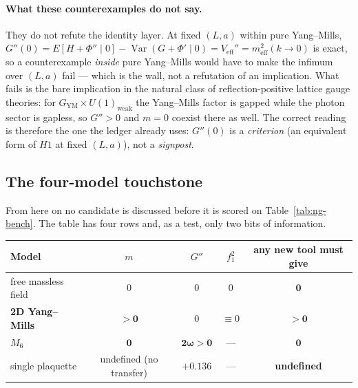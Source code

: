 \paragraph{What these counterexamples do not say.}
They do not refute the identity layer. At fixed $(L,a)$ within pure Yang--Mills,
$G''(0)=E[H+\Phi''\mid0]-\operatorname{Var}(G+\Phi'\mid0)=V_{\mathrm{eff}}''=m_{\mathrm{eff}}^2(k\to0)$
is exact, so a counterexample \emph{inside} pure Yang--Mills would have to make the infimum over
$(L,a)$ fail --- which is the wall, not a refutation of an implication. What fails is the bare
implication in the natural class of reflection-positive lattice gauge theories: for
$G_{\mathrm{YM}}\times U(1)_{\mathrm{weak}}$ the Yang--Mills factor is gapped while the photon sector
is gapless, so $G''>0$ and $m=0$ coexist there as well. The correct reading is therefore the one the
ledger already uses: $G''(0)$ is a \emph{criterion} (an equivalent form of $H1$ at fixed $(L,a)$), not
a \emph{signpost}.

\subsection{The four-model touchstone}
\label{sec:ng-touchstone}

From here on no candidate is discussed before it is scored on Table~\ref{tab:ng-bench}. The table has
four rows and, as a test, only two bits of information.

\footnotesize
\begin{center}
\begin{tabular}{@{}lcccc@{}}
\toprule
Model & $m$ & $G''$ & $f_1^2$ & any new tool must give\\
\midrule
free massless field & $0$ & $0$ & $0$ & $\mathbf 0$\\
\textbf{2D Yang--Mills} & $\mathbf{>0}$ & $0$ & $\equiv0$ & $\mathbf{>0}$\\
\textbf{$M_6$} & $\mathbf 0$ & $\mathbf{2\omega>0}$ & --- & $\mathbf 0$\\
single plaquette & undefined (no transfer) & $+0.136$ & --- & \textbf{undefined}\\
\bottomrule
\end{tabular}
\label{tab:ng-bench}
\end{center}
\normalsize

